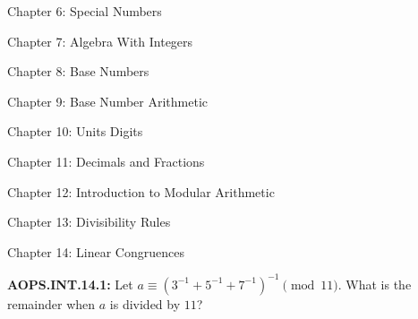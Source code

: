 \documentclass[11pt]{article}
\newenvironment{uzdevums}[1][\unskip]{%
\vspace{3mm}
\noindent
\textbf{#1:}
\noindent}
{}
\begin{document}
\vspace{30px}
\begin{center}
{\large Chapter 6: Special Numbers}
\end{center}

\vspace{30px}
\begin{center}
{\large Chapter 7: Algebra With Integers}
\end{center}

\vspace{30px}
\begin{center}
{\large Chapter 8: Base Numbers}
\end{center}


\vspace{30px}
\begin{center}
{\large Chapter 9: Base Number Arithmetic}
\end{center}

\vspace{30px}
\begin{center}
{\large Chapter 10: Units Digits}
\end{center}

\vspace{30px}
\begin{center}
{\large Chapter 11: Decimals and Fractions}
\end{center}

\vspace{30px}
\begin{center}
{\large Chapter 12: Introduction to Modular Arithmetic}
\end{center}

\vspace{30px}
\begin{center}
{\large Chapter 13: Divisibility Rules}
\end{center}
















\vspace{30px}
\begin{center}
{\large Chapter 14: Linear Congruences}
\end{center}



\begin{uzdevums}[AOPS.INT.14.1]
Let $a\equiv (3^{-1}+5^{-1}+7^{-1})^{-1}\pmod{11}$. What is the remainder when $a$ is divided by $11$?
\end{uzdevums}
\end{document}
